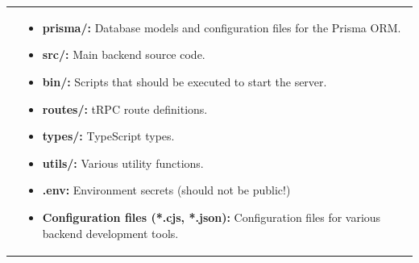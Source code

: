 \documentclass[notitlepage, 12pt]{report}
\begin{document}
\noindent\begin{xltabular}{\textwidth}{
		@{}
		p{0.3\textwidth}
		X
	}
	 &
	\begin{itemize}[label={}, leftmargin=5pt]
		\item	\textbf{prisma/:} Database models and configuration files for the Prisma ORM.
		\item	\textbf{src/:} Main backend source code.
		\item	\textbf{bin/:} Scripts that should be executed to start the server.
		\item	\textbf{routes/:} tRPC route definitions.
		\item	\textbf{types/:} TypeScript types.
		\item	\textbf{utils/:} Various utility functions.
		\item	\textbf{.env:} Environment secrets (should not be public!)
		\item	\textbf{Configuration files (*.cjs, *.json):} Configuration files for various backend development tools.
	\end{itemize}
\end{xltabular}
\end{document}
